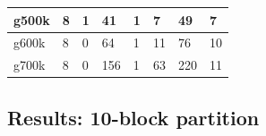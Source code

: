 \documentclass[12pt,psfig,a4]{article}
\begin{document}
\begin{table}[ht]
\begin{center}
\begin{tabular}{|l|l|l|l|l|l|l|l|}
g500k& \hspace{0.2in}8 & \hspace{0.2in}1 & \hspace{0.2in}41& \hspace{0.2in}1& \hspace{0.2in}7& \hspace{0.2in}49& \hspace{0.2in}7   \\ \hline 
g600k& \hspace{0.2in}8 & \hspace{0.2in}0 & \hspace{0.2in}64& \hspace{0.2in}1& \hspace{0.2in}11&\hspace{0.2in}76& \hspace{0.2in}10 \\ \hline 
g700k& \hspace{0.2in}8 & \hspace{0.2in}0 & \hspace{0.2in}156& \hspace{0.2in}1& \hspace{0.2in}63&\hspace{0.2in}220& \hspace{0.2in}11 \\ \hline 
\end {tabular}
\end {center}
\end {table}
\normalsize


\subsection{Results: 10-block partition}
\end{document}
